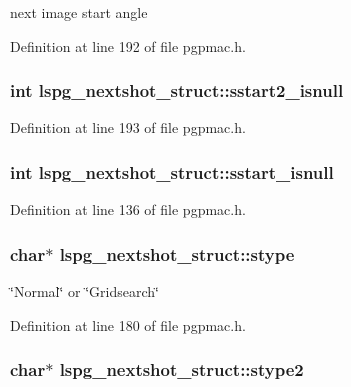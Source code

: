 next image start angle 

Definition at line 192 of file pgpmac.h.\hypertarget{structlspg__nextshot__struct_a240c8532d5ce48dbc872d5123a4e721c}{
\subsubsection[{sstart2\_\-isnull}]{\setlength{\rightskip}{0pt plus 5cm}int {\bf lspg\_\-nextshot\_\-struct::sstart2\_\-isnull}}}
\label{structlspg__nextshot__struct_a240c8532d5ce48dbc872d5123a4e721c}


Definition at line 193 of file pgpmac.h.\hypertarget{structlspg__nextshot__struct_aa53094de91e2f69d7174ab119df1cdac}{
\subsubsection[{sstart\_\-isnull}]{\setlength{\rightskip}{0pt plus 5cm}int {\bf lspg\_\-nextshot\_\-struct::sstart\_\-isnull}}}
\label{structlspg__nextshot__struct_aa53094de91e2f69d7174ab119df1cdac}


Definition at line 136 of file pgpmac.h.\hypertarget{structlspg__nextshot__struct_ab5a70b189c2fe516ca0c84bd06f3e564}{
\subsubsection[{stype}]{\setlength{\rightskip}{0pt plus 5cm}char$\ast$ {\bf lspg\_\-nextshot\_\-struct::stype}}}
\label{structlspg__nextshot__struct_ab5a70b189c2fe516ca0c84bd06f3e564}


\char`\"{}Normal\char`\"{} or \char`\"{}Gridsearch\char`\"{} 

Definition at line 180 of file pgpmac.h.\hypertarget{structlspg__nextshot__struct_ae08ef74ea76e6e099a3ff6c7f845d337}{
\subsubsection[{stype2}]{\setlength{\rightskip}{0pt plus 5cm}char$\ast$ {\bf lspg\_\-nextshot\_\-struct::stype2}}}
\label{structlspg__nextshot__struct_ae08ef74ea76e6e099a3ff6c7f845d337}


